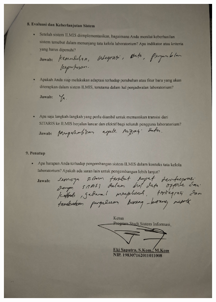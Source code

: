 \begin{figure}[h]
	\centering
	\includegraphics[width=0.82\linewidth]{konten/gambar/wawancara/5.jpg}

	\label{fig:hasil-wawancara}
\end{figure}
